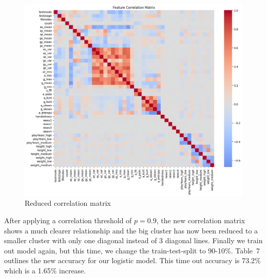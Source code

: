 \documentclass[10pt,twocolumn]{article}
\begin{document}
\begin{figure}[H]
    \centering
    \includegraphics[width=1\linewidth]{images/lr/reduced-correlation-matrix.png}
    \caption{Reduced correlation matrix}
    \label{fig:reduced-correlation-matrix}
\end{figure}
After applying a correlation threshold of $p=0.9$, the new correlation matrix shows a much clearer relationship and the big cluster has now been reduced to a smaller cluster with only one diagonal instead of 3 diagonal lines. 
Finally we train out model again, but this time, we change the train-test-split to 90-10\%. Table~7 outlines the new accuracy for our logistic model. This time out accuracy is 73.2\% which is a 1.65\% increase. 
\begin{table}[H]
\centering
\caption{Classification Report for Logistic Regression (LIBLINEAR + L1)}
\label{tab:logreg-classification-report}
\end{table}
\end{document}
